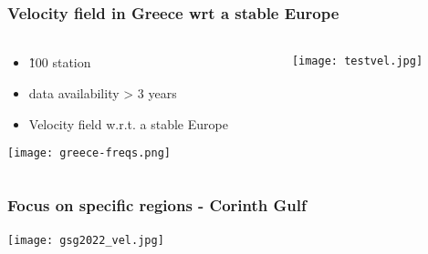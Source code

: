 \begin{frame}
  \frametitle{Velocity field in Greece wrt a stable Europe}
  \framesubtitle{}
  \label{}
  \vskip-1cm
\begin{columns}[T]
  \begin{column}{.3\textwidth}
    \begin{center}
      \begin{itemize}\setlength\itemsep{1em}
        \item \~ 100 station
        \item data availability > 3 years
        \item Velocity field w.r.t. a stable Europe \citep{kreemer14}
      \end{itemize}
      \texttt{[image: greece-freqs.png]}
    \end{center}
  \end{column}
  \begin{column}{.7\textwidth}
    \texttt{[image: testvel.jpg]}
  \end{column}
\end{columns}
\end{frame}
\note{}

\begin{frame}
  \frametitle{Focus on specific regions - Corinth Gulf}
  \framesubtitle{}
  \label{}
  
  \begin{center}
    \texttt{[image: gsg2022\_vel.jpg]}  
  \end{center}

\end{frame}
\note{}

